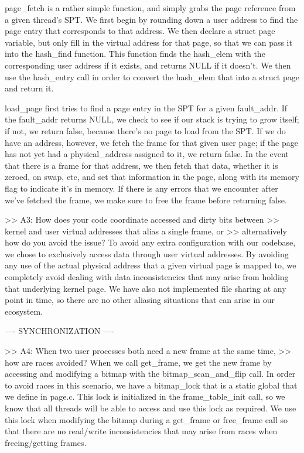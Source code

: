 page_fetch is a rather simple function, and simply grabs the page reference from a given 
thread's SPT. We first begin by rounding down a user address to find the page entry that
corresponds to that address. We then declare a struct page variable, but only fill in the
virtual address for that page, so that we can pass it into the hash_find function. This 
function finds the hash_elem with the corresponding user address if it exists, and returns 
NULL if it doesn't. We then use the hash_entry call in order to convert the hash_elem that 
into a struct page and return it.

load_page first tries to find a page entry in the SPT for a given fault_addr. If the 
fault_addr returns NULL, we check to see if our stack is trying to grow itself; if not,
we return false, because there's no page to load from the SPT. If we do have an address,
however, we fetch the frame for that given user page; if the page has not yet had a 
physical_address assigned to it, we return false. In the event that there is a frame 
for that address, we then fetch that data, whether it is zeroed, on swap, etc, and set
that information in the page, along with its memory flag to indicate it's in memory. If 
there is any errors that we encounter after we've fetched the frame, we make sure to free
the frame before returning false.

>> A3: How does your code coordinate accessed and dirty bits between
>> kernel and user virtual addresses that alias a single frame, or
>> alternatively how do you avoid the issue?
To avoid any extra configuration with our codebase, we chose to exclusively access data 
through user virtual addresses. By avoiding any use of the actual physical address that
a given virtual page is mapped to, we completely avoid dealing with data inconsistencies
that may arise from holding that underlying kernel page. We have also not implemented
file sharing at any point in time, so there are no other aliasing situations that can
arise in our ecosystem.

---- SYNCHRONIZATION ----

>> A4: When two user processes both need a new frame at the same time,
>> how are races avoided?
When we call get_frame, we get the new frame by accessing and modifying a bitmap with the
bitmap_scan_and_flip call. In order to avoid races in this scenario, we have a bitmap_lock 
that is a static global that we define in page.c. This lock is initialized in the 
frame_table_init call, so we know that all threads will be able to access and use this lock
as required. We use this lock when modifying the bitmap during a get_frame or free_frame
call so that there are no read/write inconsistencies that may arise from races when 
freeing/getting frames.

